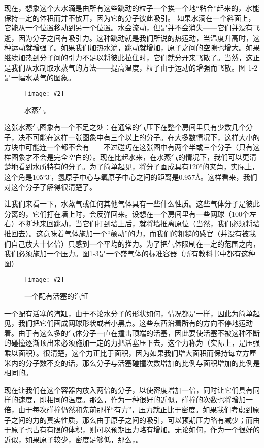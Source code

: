 \documentclass[12pt,oneside]{book}
\newenvironment{fig}[2][1]
{\begin{figure}[H]
\centering
\texttt{[image: \#2]}}
{\end{figure}}
\begin{document}
现在，想象这个大水滴是由所有这些跳动的粒子一个挨一个地“粘合”起来的，水能保持一定的体积而并不散开，因为它的分子彼此吸引。 如果水滴在一个斜面上，它能从一个位置移动到另一个位置。水会流动，但是并不会消失——它们并没有飞逝，因为分子之间有吸引力。这种跳动就是我们所说的热运动，当温度升高时，这种运动就增强了。如果我们加热水滴，跳动就增加，原子之间的空隙也增大。如果继续加热到分子间的引力不足以将彼此拉住时，它们就分开来飞散了。当然，这正是我们从水制取水蒸气的方法——提高温度，粒子由于运动的增强而飞散。图 1-2是一幅水蒸气的图象。
\begin{fig}{水蒸气}
\caption{水蒸气}
\label{fig:水蒸气}
\end{fig}
这张水蒸气图象有一个不足之处：在通常的气压下在整个房间里只有少数几个分子，决不可能在这样一张图象中有三个以上的分子。在大多数情况下，这样大小的方块中可能连一个都不会有——不过碰巧在这张图中有两个半或三个分子（只有这样图象才不会是完全空白的）。现在比起水来，在水蒸气的情况下，我们可以更清楚地看到水所特有的分子。为了简单起见，将分子画成具有120°的夹角，实际上，这个角是105°3′，氢原子中心与氧原子中心之间的距离是0.957Å。这样看来，我们对这个分子了解得很清楚了。

让我们来看一下，水蒸气或任何其他气体具有一些什么性质。这些气体分子是彼此分离的，它们打在墙上时，会反弹回来。设想在一个房间里有一些网球（100个左右）不断地来回跳动，当它们打到墙上后，就将墙推离原位（当然，我们必须将墙推回去）。这意味着气体施加一个“颤动”的力，而我们的粗糙的感官（并没有被我们自己放大十亿倍）只感到一个平均的推力。为了把气体限制在一定的范围之内，我们必须施加一个压力。图1-3是一个盛气体的标准容器（所有教科书中都有这种图）
\begin{fig}{一个配有活塞的汽缸}
\caption{一个配有活塞的汽缸}
\label{fig:一个配有活塞的汽缸}
\end{fig}
一个配有活塞的汽缸，由于不论水分子的形状如何，情况都是一样，因此为简单起见，我们把它们画成网球形状或者小黑点。这些东西沿着所有的方向不停地运动着。由于有这么多的气体分子一直在撞击顶端的活塞，因此要使活塞不被这种不断的碰撞逐渐顶出来必须施加一定的力把活塞压下去，这个力称为（实际上，是压强乘以面积）。很清楚，这个力正比于面积，因为如果我们增大面积而保持每立方厘米内的分子数不变的话，那么分子与活塞碰撞次数增加的比例与面积增加的比例是相同的。

现在让我们在这个容器内放入两倍的分子，以使密度增加一倍，同时让它们具有同样的速度，即相同的温度。那么，作为一种很好的近似，碰撞的次数也将增加一倍，由于每次碰撞仍然和先前那样“有力”，压力就正比于密度。如果我们考虑到原子之间的力的真实性质，那么由于原子之间的吸引，可以预期压力略有减少；而由于原子也占有有限的体积，则可以预期压力略有增加。无论如何，作为一个很好的近似，如果原子较少，密度足够低，那么，。
\end{document}
